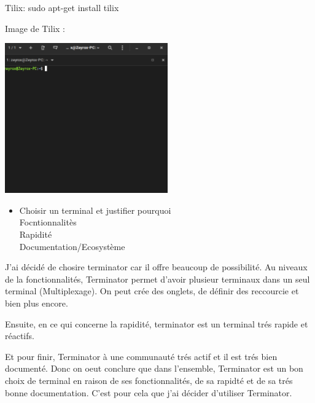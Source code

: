 \documentclass[12pt]{article}
\begin{document}
Tilix: sudo apt-get install tilix

\vspace{0.3cm}

Image de Tilix : 

\vspace{0.3cm}

\begin{center}
  \includegraphics[width=7cm]{Image-TD-9/Tilix.png}
\end{center}

\vspace{0.3cm}

\begin{itemize}
  \item Choisir un terminal et justifier pourquoi \\
  Focntionnalitès\\
  Rapidité\\
  Documentation/Ecosystème
\end{itemize}

\vspace{0.3cm}

J'ai décidé de chosire terminator car il offre beaucoup de possibilité.
Au niveaux de la fonctionnalités, Terminator permet d'avoir plusieur terminaux dans un seul terminal (Multiplexage).
On peut crée des onglets, de définir des reccourcie et bien plus encore.

\vspace{0.3cm}

Ensuite, en ce qui concerne la rapidité, terminator est un terminal trés rapide et réactifs. 

\vspace{0.3cm}

Et pour finir, Terminator à une communauté trés actif et il est trés bien documenté. Donc on oeut conclure que dans l'ensemble, 
Terminator est un bon choix de terminal en raison de ses fonctionnalités, de sa rapidté et de sa trés bonne documentation.
C'est pour cela que j'ai décider d'utiliser Terminator. 
\end{document}
